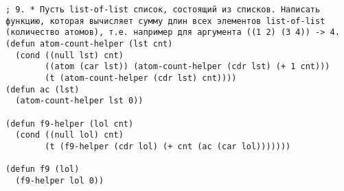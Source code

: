 \documentclass[a4paper,oneside,14pt]{extarticle}
\begin{document}
\begin{lstlisting}
; 9. * Пусть list-of-list список, состоящий из списков. Написать функцию, которая вычисляет сумму длин всех элементов list-of-list (количество атомов), т.е. например для аргумента ((1 2) (3 4)) -> 4.
(defun atom-count-helper (lst cnt)
  (cond ((null lst) cnt)
        ((atom (car lst)) (atom-count-helper (cdr lst) (+ 1 cnt)))
        (t (atom-count-helper (cdr lst) cnt))))
(defun ac (lst)
  (atom-count-helper lst 0))

(defun f9-helper (lol cnt)
  (cond ((null lol) cnt)
        (t (f9-helper (cdr lol) (+ cnt (ac (car lol)))))))

(defun f9 (lol)
  (f9-helper lol 0))
\end{lstlisting}

\end{document}

